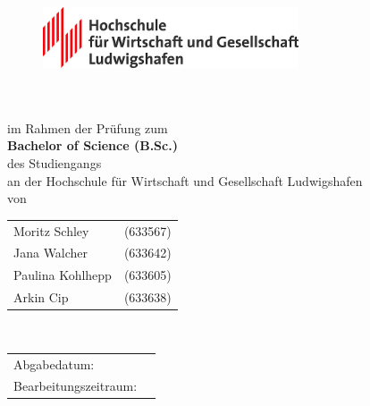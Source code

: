 \thispagestyle{empty}
\begin{titlepage}
\enlargethispage{4cm}

\begin{figure}[ht]
	\centering
	\includegraphics[height=1.8cm]{Bilder/Logos/Logo_HWG-Lu.jpg}
\end{figure} 
\vspace*{0.1cm}

\begin{center}
	\huge{\textbf{\titel}}\\[1.5cm]
	\Large{\textbf{\arbeit}}\\[0.5cm]
	\normalsize{im Rahmen der Prüfung zum\\[1ex] \textbf{Bachelor of Science (B.Sc.)}}\\[0.5cm]
	\Large{des Studiengangs \studiengang}\\[1ex]
	\normalsize{an der Hochschule für Wirtschaft und Gesellschaft Ludwigshafen}\\[1cm]
	\normalsize{von}\\[1ex] \begin{tabular}{ll}
	Moritz Schley 		& (633567) \\
	Jana Walcher 		& (633642) \\
	Paulina Kohlhepp 	& (633605) \\
	Arkin Cip 			& (633638) \\
		
	\end{tabular}\\[1cm]
\end{center}

\begin{center}
	\vfill
	\begin{tabular}{ll}
		Abgabedatum:                     & \abgabe \\[0.2cm]
		Bearbeitungszeitraum:            & \bearbeitungszeitraum \\[0.2cm]
	\end{tabular} 
\end{center}
\end{titlepage}
